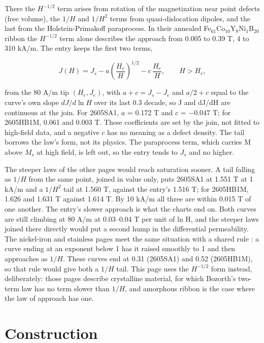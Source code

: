\documentclass[
  11pt,
]{article}
\begin{document}
There the \(H^{-1/2}\) term arises from rotation of the magnetization near point defects (free volume), the \(1/H\) and \(1/H^{2}\) terms from quasi-dislocation dipoles, and the last from the Holstein-Primakoff paraprocess. In their annealed Fe\(_{61}\)Co\(_{10}\)Y\(_{8}\)Ni\(_{1}\)B\(_{20}\) ribbon the \(H^{-1/2}\) term alone describes the approach from 0.005 to 0.39 T, 4 to 310 kA/m. The entry keeps the first two terms,

\begin{equation}\label{eq:tail}
J(H) = J_s - a\left(\frac{H_e}{H}\right)^{1/2} - c\,\frac{H_e}{H}, \qquad H > H_e,
\end{equation}

from the 80 A/m tip \((H_e, J_e)\), with \(a + c = J_s - J_e\) and \(a/2 + c\) equal to the curve's own slope \(dJ/d\ln H\) over its last 0.3 decade, so J and dJ/dH are continuous at the join. For 2605SA1, \(a\) = 0.172 T and \(c\) = \(-0.047\) T; for 2605HB1M, 0.061 and 0.003 T. These coefficients are set by the join, not fitted to high-field data, and a negative \(c\) has no meaning as a defect density. The tail borrows the law's form, not its physics. The paraprocess term, which carries M above \(M_s\) at high field, is left out, so the entry tends to \(J_s\) and no higher.

The steeper laws of the other pages would reach saturation sooner. A tail falling as \(1/H\) from the same point, joined in value only, puts 2605SA1 at 1.551 T at 1 kA/m and a \(1/H^{2}\) tail at 1.560 T, against the entry's 1.516 T; for 2605HB1M, 1.626 and 1.631 T against 1.614 T. By 10 kA/m all three are within 0.015 T of one another. The entry's slower approach is what the charts end on. Both curves are still climbing at 80 A/m at 0.03--0.04 T per unit of ln H, and the steeper laws joined there directly would put a second hump in the differential permeability. The nickel-iron and stainless pages meet the same situation with a shared rule \cite{meeker-nife}: a curve ending at an exponent below 1 has it raised smoothly to 1 and then approaches as \(1/H\). These curves end at 0.31 (2605SA1) and 0.52 (2605HB1M), so that rule would give both a \(1/H\) tail. This page uses the \(H^{-1/2}\) form instead, deliberately: those pages describe crystalline material, for which Bozorth's two-term law has no term slower than \(1/H\), and amorphous ribbon is the case where the law of approach has one.

\section{Construction}\label{construction}
\end{document}
